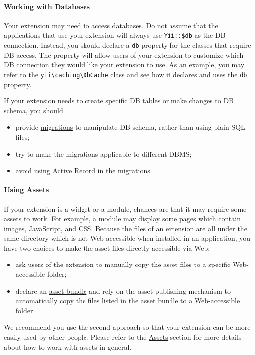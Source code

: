 \paragraph{Working with Databases \label{structure-extensions.md::working-with-databases}}
Your extension may need to access databases. Do not assume that the applications that use your extension will always
use \lstinline|Yii::$db| as the DB connection. Instead, you should declare a \lstinline|db| property for the classes that require DB access.
The property will allow users of your extension to customize which DB connection they would like your extension to use.
As an example, you may refer to the \texttt{yii{\allowbreak{}\textbackslash}caching{\allowbreak{}\textbackslash}DbCache} class and see how it declares and uses the \lstinline|db| property.

If your extension needs to create specific DB tables or make changes to DB schema, you should

\begin{itemize}
\item provide \hyperref[db-migrations.md]{migrations} to manipulate DB schema, rather than using plain SQL files;
\item try to make the migrations applicable to different DBMS;
\item avoid using \hyperref[db-active-record.md]{Active Record} in the migrations.
\end{itemize}
\paragraph{Using Assets \label{structure-extensions.md::using-assets}}
If your extension is a widget or a module, chances are that it may require some \hyperref[structure-assets.md]{assets} to work.
For example, a module may display some pages which contain images, JavaScript, and CSS. Because the files of an
extension are all under the same directory which is not Web accessible when installed in an application, you have
two choices to make the asset files directly accessible via Web:

\begin{itemize}
\item ask users of the extension to manually copy the asset files to a specific Web-accessible folder;
\item declare an \hyperref[structure-assets.md]{asset bundle} and rely on the asset publishing mechanism to automatically
copy the files listed in the asset bundle to a Web-accessible folder.
\end{itemize}
We recommend you use the second approach so that your extension can be more easily used by other people.
Please refer to the \hyperref[structure-assets.md]{Assets} section for more details about how to work with assets in general.

